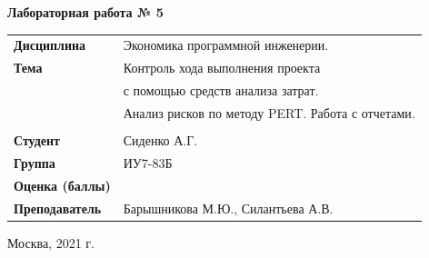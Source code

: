 \documentclass[a4paper,14pt]{extreport} %
\begin{document}
\begin{titlepage}
    \vspace{2cm}

    \begin{center}
        \textbf{Лабораторная работа № 5} \\
        \vspace{0.5cm}
    \end{center}

    \vspace{4cm}

    \begin{flushleft}
        \begin{tabular}{ll}
            \textbf{Дисциплина} & Экономика программной инженерии.  \\
            \textbf{Тема} & Контроль хода выполнения проекта \\ 
            & с помощью средств анализа затрат. \\
            & Анализ рисков по методу PERT. Работа с отчетами. \\
            \\
            \textbf{Студент} & Сиденко А.Г. \\
            \textbf{Группа} & ИУ7-83Б \\
            \textbf{Оценка (баллы)} & \\
            \textbf{Преподаватель} & Барышникова М.Ю., Силантьева А.В.   \\
        \end{tabular}
    \end{flushleft}

    \vspace{4cm}

   \begin{center}
        Москва, 2021 г.
    \end{center}

\end{titlepage}
\end{document}
